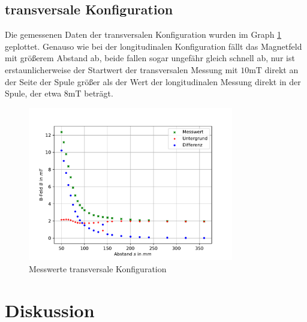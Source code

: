\documentclass[11pt, a4paper]{article}
\begin{document}
    \subsection{transversale Konfiguration}
    Die gemessenen Daten der transversalen Konfiguration wurden im Graph \ref{fig:transmess} geplottet.
    Genauso wie bei der longitudinalen Konfiguration fällt das Magnetfeld mit größerem Abstand ab, beide fallen sogar ungefähr gleich schnell ab, nur ist erstaunlicherweise der Startwert der transversalen Messung mit $10 \si{\milli\tesla}$ direkt an der Seite der Spule größer als der Wert der longitudinalen Messung direkt in der Spule, der etwa $8 \si{\milli\tesla}$ beträgt.
    \begin{figure}[h]
        \centering
        \includegraphics[width=0.8\textwidth]{raw2.pdf}
        \caption{Messwerte transversale Konfiguration}
        \label{fig:transmess}
    \end{figure}


    \section{Diskussion}

    
    
\end{document}
